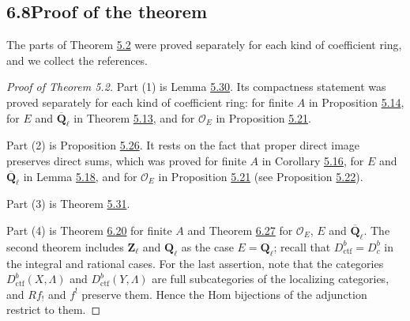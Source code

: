 \documentclass[11pt]{article}
\providecommand{\Dbc}{}\renewcommand{\Dbc}{D^b_c}
\begin{document}
\subsection*{\texorpdfstring{6.8\quad Proof of the theorem}{6.8 Proof of the theorem}}
\label{bp598}%
\label{bp599}%
The parts of Theorem \hyperref[bp413]{5.2} were proved separately for each kind of coefficient ring, and we collect the references.

\begin{proof}[{Proof of Theorem 5.2}]\label{bp600}%
Part (1) is Lemma \hyperref[bp503]{5.30}. Its compactness statement was proved separately for each kind of coefficient ring: for finite \(A\) in Proposition \hyperref[bp451]{5.14}, for \(E\) and \(\overline{\mathbf Q}_\ell\) in Theorem \hyperref[bp446]{5.13}, and for \(\mathcal O_E\) in Proposition \hyperref[bp477]{5.21}.

Part (2) is Proposition \hyperref[bp492]{5.26}. It rests on the fact that proper direct image preserves direct sums, which was proved for finite \(A\) in Corollary \hyperref[bp457]{5.16}, for \(E\) and \(\overline{\mathbf Q}_\ell\) in Lemma \hyperref[bp467]{5.18}, and for \(\mathcal O_E\) in Proposition \hyperref[bp477]{5.21} (see Proposition \hyperref[bp482]{5.22}).

Part (3) is Theorem \hyperref[bp506]{5.31}.

Part (4) is Theorem \hyperref[bp573]{6.20} for finite \(A\) and Theorem \hyperref[bp596]{6.27} for \(\mathcal O_E\), \(E\) and \(\overline{\mathbf Q}_\ell\). The second theorem includes \(\mathbf Z_\ell\) and \(\mathbf Q_\ell\) as the case \(E=\mathbf Q_\ell\); recall that \(D^b_{\mathrm{ctf}}=\Dbc\) in the integral and rational cases. For the last assertion, note that the categories \(D^b_{\mathrm{ctf}}(X,\Lambda)\) and \(D^b_{\mathrm{ctf}}(Y,\Lambda)\) are full subcategories of the localizing categories, and \(Rf_!\) and \(f^!\) preserve them. Hence the Hom bijections of the adjunction restrict to them.
\end{proof}



\end{document}
